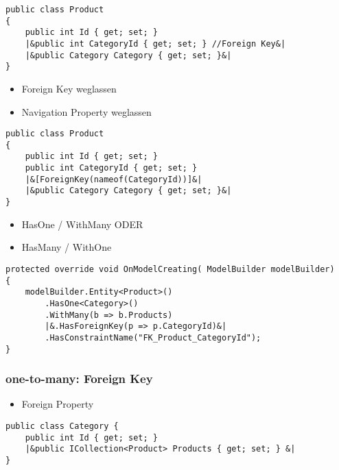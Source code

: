 \begin{multicols*}{2}
\begin{lstlisting}
public class Product
{
    public int Id { get; set; }
    |&public int CategoryId { get; set; } //Foreign Key&|
    |&public Category Category { get; set; }&|
}
\end{lstlisting}
\begin{itemize}
    \item Foreign Key weglassen
    \item Navigation Property weglassen
\end{itemize}
\begin{lstlisting}
public class Product
{
    public int Id { get; set; }
    public int CategoryId { get; set; } 
    |&[ForeignKey(nameof(CategoryId))]&|
    |&public Category Category { get; set; }&|
}    
\end{lstlisting}
\begin{itemize}
    \item HasOne / WithMany ODER
    \item HasMany / WithOne
\end{itemize}
\begin{lstlisting}
protected override void OnModelCreating( ModelBuilder modelBuilder)
{
    modelBuilder.Entity<Product>()
        .HasOne<Category>()
        .WithMany(b => b.Products)
        |&.HasForeignKey(p => p.CategoryId)&|
        .HasConstraintName("FK_Product_CategoryId");
}
\end{lstlisting}

\subsubsection{one-to-many: Foreign Key}
\begin{itemize}
    \item Foreign Property
\end{itemize}
\begin{lstlisting}
public class Category {
    public int Id { get; set; }
    |&public ICollection<Product> Products { get; set; } &|
}


\end{lstlisting}
\end{multicols*}
